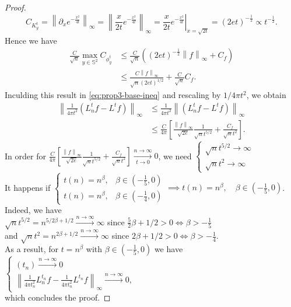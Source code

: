 \documentclass{article} %
\newcommand{\norm}[1]{\left\lVert#1\right\rVert}
\renewcommand{\S}{\mathbb{S}}
\newcommand{\linefrac}[2]{
    {#1/#2}
}
\begin{document}
\begin{proof}
\begin{equation*}
C_{K^t_y} = \norm{\partial_x e^{-\frac{x^2}{4t}}}_\infty = \norm{\frac{x}{2t}e^{-\frac{x^2}{4t}}}_\infty = \left. \frac{x}{2t}e^{-\frac{x^2}{4t}}\right|_{x=\sqrt{2t}}=(2et)^{-\frac{1}{2}}\propto t ^ {-\frac{1}{2}}.
\end{equation*}
Hence we have
\begin{align*}
	\frac{C}{\sqrt{n}}  \max _{y\in \S^2} C_{\phi^t_y} 
	&\leq  \frac{C}{\sqrt{n}} \left( (2et)^{-\frac{1}{2}} \norm{f}_\infty + C_f \right)\\
	&\leq \frac{C \norm{f}_\infty}{\sqrt{n}(2et)^{1/2}} +   \frac{C}{\sqrt{n}} C_f.
\end{align*}
Inculding this result in \eqref{eq:prop3-base-ineq} and rescaling by $\linefrac{1}{4\pi t^2}$, we obtain
\begin{align*}
	\norm{\frac{1}{4\pi t^2}\left(L_n^tf-L^tf\right)}_\infty&\leq \frac{1}{4\pi t^2}\norm{\left(L_n^tf-L^tf\right)}_\infty \\
	&\leq \frac{C}{4\pi}\left[\frac{\norm{f}_\infty}{\sqrt{2e}}\frac{1}{\sqrt{n}t^{5/2}} + \frac{C_f}{\sqrt{n}t^2}\right].
\end{align*}
In order for $ \frac{C}{4\pi}\left[\frac{\norm{f}_\infty}{\sqrt{2e}}\frac{1}{\sqrt{n}t^{5/2}} + \frac{C_f}{\sqrt{n}t^2}\right] \xrightarrow[t\to 0 ]{n\to\infty}0$, 
we need $\begin{cases}
\sqrt{n}t^{5/2} \rightarrow \infty\\
\sqrt{n}t^2 \rightarrow \infty
\end{cases}$ \\
It happens if $\begin{cases}
t(n) = n^\beta, &\beta\in(-\frac{1}{5}, 0) \\
t(n) = n^\beta, &\beta\in(-\frac{1}{4}, 0)
\end{cases} \implies t(n) = n^\beta, \quad \beta\in(-\frac{1}{5}, 0)$.\\
Indeed, we have\\
$\sqrt{n}t^{5/2}=n^{5/2\beta+1/2}\xrightarrow{n \to \infty} \infty$ since $\frac{5}{2}\beta+1/2>0 \iff \beta>-\frac{1}{5}$\\
and $\sqrt{n}t^2=n^{2\beta+1/2}\xrightarrow {n \to \infty} \infty$ since $2\beta+1/2>0 \iff \beta>-\frac{1}{4}$.\\
As a result, for $t=n^\beta$ with $\beta\in(-\frac{1}{5}, 0)$ we have
$\begin{cases}
(t_n)\xrightarrow{n\to\infty}0\\
\norm{\frac{1}{4\pi t_n^2}L_n^{t_n}f-\frac{1}{4\pi t_n^2}L^{t_n}f}_\infty  \xrightarrow{n\to\infty}0,
\end{cases}$\\
which concludes the proof.
\end{proof}
\end{document}
